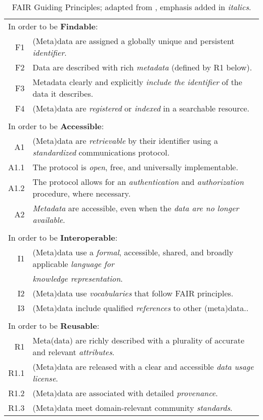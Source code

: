 \begin{table}[htp]
\small
\begin{tabular}{|r l|}
    \hline
    \multicolumn{2}{|l|}{In order to be \textbf{Findable}:} \\
    F1 & (Meta)data are assigned a globally unique and persistent \emph{identifier}. \\
    F2 & Data are described with rich \emph{metadata} (defined by R1 below). \\
    F3 & Metadata clearly and explicitly \emph{include the identifier} of the data it describes. \\
    F4 & (Meta)data are \emph{registered} or \emph{indexed} in a searchable resource. \\
    & \\
     \multicolumn{2}{|l|}{In order to be \textbf{Accessible}:} \\


    A1 & (Meta)data are \emph{retrievable} by their identifier using a 
        \emph{standardized} communications protocol. \\
    A1.1 & The protocol is \emph{open}, free, and universally implementable. \\
    A1.2 & The protocol allows for an \emph{authentication} and  
            \emph{authorization} procedure, where necessary. \\
     A2 & \emph{Metadata} are accessible, even when the \emph{data are no longer available}. \\

     & \\
     \multicolumn{2}{|l|}{In order to be \textbf{Interoperable}:} \\
     I1 & 
     (Meta)data use a \emph{formal}, accessible, shared, and 
         broadly applicable \emph{language for} \\
        &  \emph{knowledge representation}. \\
     I2 & (Meta)data use \emph{vocabularies} that follow FAIR principles. \\
     I3 & (Meta)data include qualified \emph{references} to other (meta)data.. \\

     & \\
     \multicolumn{2}{|l|}{In order to be \textbf{Reusable}:} \\
     R1 & Meta(data) are richly described with a plurality of 
         accurate and relevant \emph{attributes}. \\
            R1.1 & (Meta)data are released with a clear and accessible \emph{data usage license}. \\
            R1.2 & (Meta)data are associated with detailed \emph{provenance}. \\
            R1.3 & (Meta)data meet domain-relevant community \emph{standards}. \\
    \hline

\end{tabular}
\caption[FAIR Guiding Principles]{FAIR Guiding Principles; adapted from \cite{Wilkinson 2016}, emphasis added in \emph{italics}.}
\label{ch10:fair}
\end{table}

